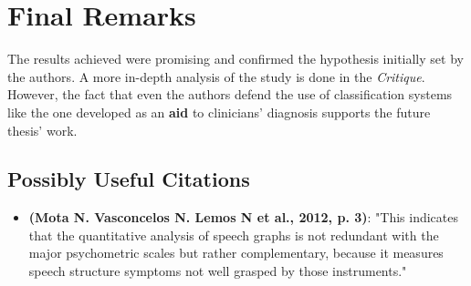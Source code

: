\documentclass{Paper_Summary}
\begin{document}
\section{Final Remarks}
    
    The results achieved were promising and confirmed the hypothesis initially set by the authors.
    A more in-depth analysis of the study is done in the \emph{Critique}. However, the fact that even the authors defend the use of classification systems like the one developed as an \textbf{aid} to clinicians' diagnosis supports the future thesis' work.

\breakline

\begin{center}
    \section*{Possibly Useful Citations}
\end{center}

    \begin{itemize}
        \item \textbf{(Mota N. Vasconcelos N. Lemos N et al., 2012, p. 3)}: "This indicates that the quantitative analysis of speech graphs is not redundant with the major psychometric scales but rather complementary, because it measures speech structure symptoms not well grasped by those instruments."
    \end{itemize}
\end{document}

